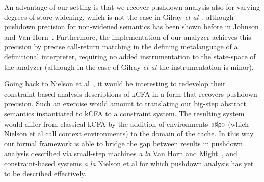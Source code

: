 An advantage of our setting is that we recover pushdown analysis also for
varying degrees of store-widening, which is not the case in Gilray \emph{et
al}~\cite{local:p4f}, although pushdown precision for non-widened semantics has been
shown before in Johnson and Van Horn~\cite{dvanhorn:Johnson2014Abstracting}.
Furthermore, the implementation of our analyzer achieves this precision by
precise call-return matching in the defining metalanguage of a definitional
interpreter, requiring no added instrumentation to the state-space of the
analyzer (although in the case of Gilray \emph{et al} the instrumentation is
minor).

Going back to Nielson et al~\cite{dvanhorn:Neilson:1999}, it would be interesting to redevelop
their constraint-based analysis descriptions of kCFA in a form that
recovers pushdown precision. Such an exercise would amount to translating our
big-step abstract semantics instantiated to kCFA to a constraint system. The
resulting system would differ from classical kCFA by the addition of
environments «♯{ρ}» (which Nielson et al call context environments) to the
domain of the cache. In this way our formal framework is able to bridge the gap
between results in pushdown analysis described via small-step machines \emph{a
la} Van Horn and Might~\cite{dvanhorn:VanHorn2010Abstracting}, and
constraint-based systems \emph{a la} Nielson et al for which pushdown analysis
has yet to be described effectively.
